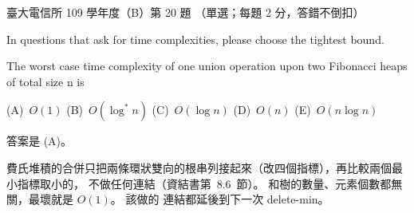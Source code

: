 \begin{pastexam}[label={px:ntu-109-comm-dsa-20}]{臺大電信所 109 學年度（B）第 20 題}
（單選；每題 2 分，答錯不倒扣）

In questions that ask for time complexities, please choose the tightest bound.

The worst case time complexity of one union operation upon two Fibonacci heaps of total size n is

(A)~$O(1)$ \qquad (B)~$O(\log^* n)$ \qquad (C)~$O(\log n)$ \qquad (D)~$O(n)$ \qquad (E)~$O(n\log n)$
\end{pastexam}

\begin{pastsoln}
答案是 (A)。

費氏堆積的合併只把兩條環狀雙向的根串列接起來（改四個指標），再比較兩個最小指標取小的，
不做任何連結（資結書第~8.6~節）。 和樹的數量、元素個數都無關，最壞就是 $O(1)$。 該做的
連結都延後到下一次 delete-min。
\end{pastsoln}
